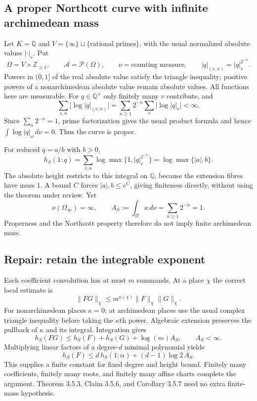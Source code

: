 \documentclass[11pt,a4paper]{article}
\newcommand{\Q}{\mathbb Q}
\newcommand{\Z}{\mathbb Z}
\newcommand{\A}{\mathcal A}
\begin{document}
\subsection{A proper Northcott curve with infinite archimedean mass}
Let $K=\Q$ and $V=\{\infty\}\sqcup\{\text{rational primes}\}$, with the usual normalized absolute values $|\cdot|_v$. Put
\[
 \Omega=V\times\Z_{\ge1},\qquad \A=\mathcal P(\Omega),\qquad
 \nu=\text{counting measure},\qquad |q|_{(v,n)}=|q|_v^{2^{-n}}.
\]
Powers in $(0,1]$ of the real absolute value satisfy the triangle inequality; positive powers of a nonarchimedean absolute value remain absolute values. All functions here are measurable. For $q\in\Q^\times$ only finitely many $v$ contribute, and
\[
 \sum_{v,n}\bigl|\log|q|_{(v,n)}\bigr|
 =\sum_{n\ge1}2^{-n}\sum_v\bigl|\log|q|_v\bigr|<\infty.
\]
Since $\sum_n2^{-n}=1$, prime factorization gives the usual product formula and hence $\int\log|q|_\omega\,d\nu=0$. Thus the curve is proper.

For reduced $q=a/b$ with $b>0$,
\[
 h_S(1:q)=\sum_{v,n}\log\max\{1,|q|_v^{2^{-n}}\}
 =\log\max\{|a|,b\}.
\]
The absolute height restricts to this integral on $\Q$, because the extension fibres have mass 1. A bound $C$ forces $|a|,b\le e^C$, giving finiteness directly, without using the theorem under review. Yet
\[
 \nu(\Omega_\infty)=\infty,\qquad
 A_S:=\int_\Omega\kappa\,d\nu=\sum_{n\ge1}2^{-n}=1.
\]
Properness and the Northcott property therefore do not imply finite archimedean mass.

\subsection{Repair: retain the integrable exponent}
Each coefficient convolution has at most $m$ summands. At a place $\chi$ the correct local estimate is
\[
 \|FG\|_\chi\le m^{\kappa(\chi)}\|F\|_\chi\|G\|_\chi.
\]
For nonarchimedean places $\kappa=0$; at archimedean places use the usual complex triangle inequality before taking the $\kappa$th power. Algebraic extension preserves the pullback of $\kappa$ and its integral. Integration gives
\[
 \boxed{h_S(FG)\le h_S(F)+h_S(G)+\log(m)A_S,\qquad A_S<\infty.}
\]
Multiplying linear factors of a degree-$d$ minimal polynomial yields
\[
 h_S(F)\le d\,h_S(1:\alpha)+(d-1)\log2\,A_S.
\]
This supplies a finite constant for fixed degree and height bound. Finitely many coefficients, finitely many roots, and finitely many affine charts complete the argument. Theorem 3.5.3, Claim 3.5.6, and Corollary 3.5.7 need no extra finite-mass hypothesis.
\end{document}
